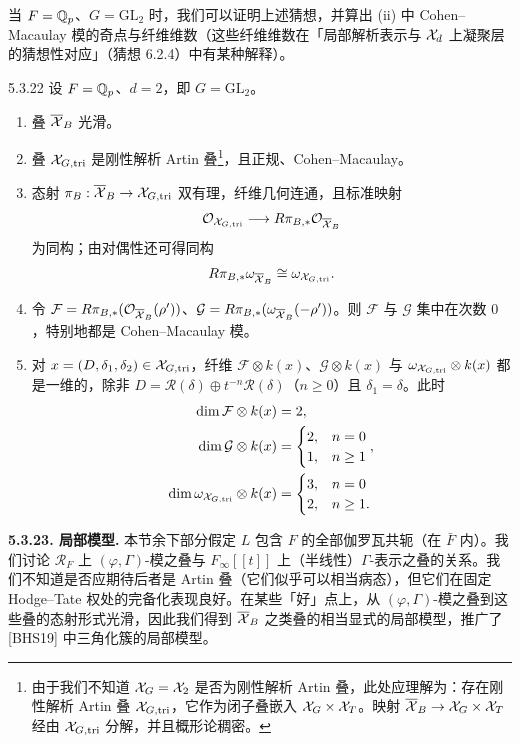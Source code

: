 当 $F=\mathbb{Q}_p$、$G=\mathrm{GL}_2$ 时，我们可以证明上述猜想，并算出 (ii) 中 Cohen–Macaulay 模的奇点与纤维维数（这些纤维维数在「局部解析表示与 $\mathcal{X}_d$ 上凝聚层的猜想性对应」（猜想 6.2.4）中有某种解释）。

\begin{thm}{5.3.22}\label{thm:a4-5-3-22}
设 $F=\mathbb{Q}_p$、$d=2$，即 $G=\mathrm{GL}_2$。
\begin{enumerate}[label=(\roman*),leftmargin=2.2em,itemsep=0.1em]
\item 叠 $\overline{\mathcal{X}}_B$ 光滑。
\item 叠 $\mathcal{X}_{G,\mathrm{tri}}$ 是刚性解析 Artin 叠\footnote{由于我们不知道 $\mathcal{X}_G=\mathcal{X}_2$ 是否为刚性解析 Artin 叠，此处应理解为：存在刚性解析 Artin 叠 $\mathcal{X}_{G,\mathrm{tri}}$，它作为闭子叠嵌入 $\mathcal{X}_G\times\mathcal{X}_T$。映射 $\overline{\mathcal{X}}_B\to\mathcal{X}_G\times\mathcal{X}_T$ 经由 $\mathcal{X}_{G,\mathrm{tri}}$ 分解，并且概形论稠密。}，且正规、Cohen–Macaulay。
\item 态射 $\pi_B:\overline{\mathcal{X}}_B\to\mathcal{X}_{G,\mathrm{tri}}$ 双有理，纤维几何连通，且标准映射
\[
\mathcal{O}_{\mathcal{X}_{G,\mathrm{tri}}}\longrightarrow R\pi_{B,*}\mathcal{O}_{\overline{\mathcal{X}}_B}
\]
为同构；由对偶性还可得同构
\[
R\pi_{B,*}\omega_{\overline{\mathcal{X}}_B}\cong\omega_{\mathcal{X}_{G,\mathrm{tri}}}.
\]
\item 令 $\mathcal F=R\pi_{B,*}(\mathcal{O}_{\overline{\mathcal{X}}_B}(\rho'))$、$\mathcal G=R\pi_{B,*}(\omega_{\overline{\mathcal{X}}_B}(-\rho'))$。则 $\mathcal F$ 与 $\mathcal G$ 集中在次数 $0$，特别地都是 Cohen–Macaulay 模。
\item {}对 $x=(D,\delta_1,\delta_2)\in\mathcal{X}_{G,\mathrm{tri}}$，纤维 $\mathcal F\otimes k(x)$、$\mathcal G\otimes k(x)$ 与 $\omega_{\mathcal{X}_{G,\mathrm{tri}}}\otimes k(x)$ 都是一维的，除非 $D=\mathcal R(\delta)\oplus t^{-n}\mathcal R(\delta)$（$n\ge0$）且 $\delta_1=\delta$。此时
\[
\begin{aligned}
\dim\mathcal F\otimes k(x)&=2,\\
\dim\mathcal G\otimes k(x)&=\begin{cases}2,&n=0\\1,&n\ge1\end{cases},\\
\dim\omega_{\mathcal{X}_{G,\mathrm{tri}}}\otimes k(x)&=\begin{cases}3,&n=0\\2,&n\ge1.\end{cases}
\end{aligned}
\]
\end{enumerate}
\end{thm}

\medskip\noindent\textbf{5.3.23. 局部模型.} 本节余下部分假定 $L$ 包含 $F$ 的全部伽罗瓦共轭（在 $\bar F$ 内）。我们讨论 $\mathcal R_F$ 上 $(\varphi,\Gamma)$-模之叠与 $F_\infty[[t]]$ 上（半线性）$\Gamma$-表示之叠的关系。我们不知道是否应期待后者是 Artin 叠（它们似乎可以相当病态），但它们在固定 Hodge–Tate 权处的完备化表现良好。在某些「好」点上，从 $(\varphi,\Gamma)$-模之叠到这些叠的态射形式光滑，因此我们得到 $\overline{\mathcal{X}}_B$ 之类叠的相当显式的局部模型，推广了 [BHS19] 中三角化簇的局部模型。

